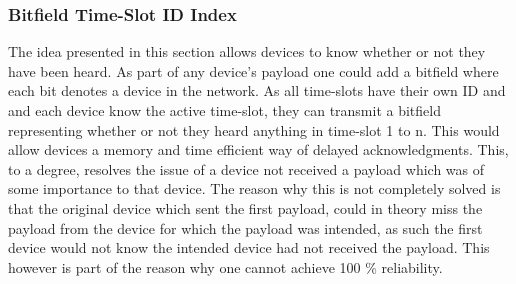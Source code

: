 \subsubsection*{Bitfield Time-Slot ID Index}
The idea presented in this section allows devices to know whether or not they have been heard.
As part of any device's payload one could add a bitfield where each bit denotes a device in the network.
As all time-slots have their own ID and and each device know the active time-slot, they can transmit a bitfield representing whether or not they heard anything in time-slot 1 to n.
This would allow devices a memory and time efficient way of delayed acknowledgments.
This, to a degree, resolves the issue of a device not received a payload which was of some importance to that device.
The reason why this is not completely solved is that the original device which sent the first payload, could in theory miss the payload from the device for which the payload was intended, as such the first device would not know the intended device had not received the payload.
This however is part of the reason why one cannot achieve 100 \% reliability.
